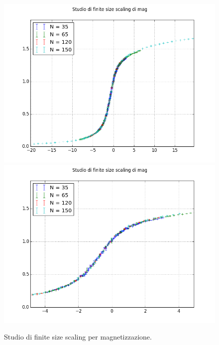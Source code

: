 \begin{center}
	\begin{figure}
	\centering
		\includegraphics[scale=0.55]{potts/magfss.png}
		\includegraphics[scale=0.55]{potts/magfsszoom.png}
		\caption{Studio di finite size scaling per magnetizzazione.}	
	\end{figure}
\end{center}


